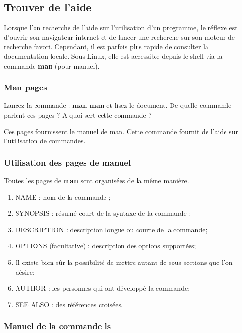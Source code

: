 \documentclass[11pt]{article}
\begin{document}
\subsection{Trouver de l'aide}

Lorsque l'on recherche de l'aide sur l'utilisation d'un programme, le réflexe est d'ouvrir son navigateur internet et de
lancer une recherche sur son moteur de recherche favori. Cependant, il est parfois plus rapide de consulter la
documentation locale. Sous Linux, elle est accessible depuis le shell via la commande \textbf{man} (pour manuel).

\subsubsection{Man pages}

Lancez la commande : \textbf{man man} et lisez le document. De quelle commande parlent ces pages ? A quoi sert cette commande ?

\begin{solution}
 Ces pages fournissent le manuel de man. Cette commande fournit de l'aide sur l'utilisation de commandes.
\end{solution}

\subsubsection{Utilisation des pages de manuel}

Toutes les pages de \textbf{man} sont organisées de la même manière.

\begin{enumerate}
 \item{NAME} : nom de la commande ;
 \item{SYNOPSIS} : résumé court de la syntaxe de la commande ;
 \item{DESCRIPTION} : description longue ou courte de la commande;
 \item{OPTIONS} (facultative) : description des options supportées;
 \item Il existe bien sûr la possibilité de mettre autant de sous-sections que l'on désire;
 \item{AUTHOR} : les personnes qui ont développé la commande;
 \item{SEE ALSO} : des références croisées.
\end{enumerate}

\subsubsection{Manuel de la commande \textbf{ls}}
\end{document}
